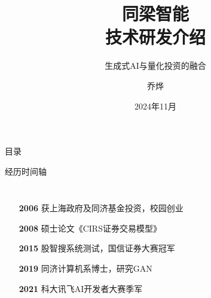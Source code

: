 \documentclass[aspectratio=169, xcolor=table]{beamer}
\title{同梁智能\\技术研发介绍}
\subtitle{生成式AI与量化投资的融合}
\author{乔烨}
\institute{CTO | 同济大学博士生 | 人工智能量化投资学会会长 \\ 手机：18621009008 \quad 邮箱：9@qiaoye.com}
\date{2024年11月}
\begin{document}
\begin{frame}
    \titlepage
\end{frame}

\begin{frame}{目录}
    \tableofcontents
\end{frame}

\begin{frame}{经历时间轴}
    \begin{columns}[T]
            \centering
            \vspace{-0.5cm}
            \begin{itemize}
                \item[\textcolor{TongLiangCyan}{\bfseries 2006}] 获上海政府及同济基金投资，校园创业
                \item[\textcolor{TongLiangCyan}{\bfseries 2008}] 硕士论文《CIRS证券交易模型》
                \item[\textcolor{TongLiangCyan}{\bfseries 2015}] 股智搜系统测试，国信证券大赛冠军
                \item[\textcolor{TongLiangCyan}{\bfseries 2019}] 同济计算机系博士，研究GAN
                \item[\textcolor{TongLiangCyan}{\bfseries 2021}] 科大讯飞AI开发者大赛季军
            \end{itemize}
    \end{columns}
\end{frame}
\end{document}
